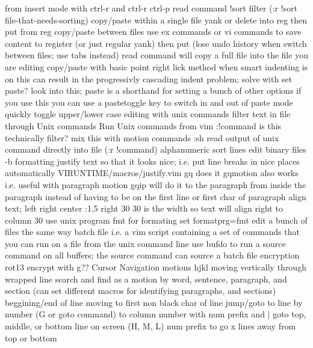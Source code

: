 \documentclass[12pt]{book}
\begin{document}
      from insert mode with ctrl-r and ctrl-r ctrl-p
    read command
      !sort filter (:r !sort file-that-needs-sorting)
    copy/paste within a single file
      yank or delete into reg then put from reg
    copy/paste between files
      use ex commands or vi commands to save content to register (or just regular yank) then put (lose undo history when switch between files; use tabs instead)
      read command will copy a full file into the file you are editing
    copy/paste with basic point right lick method
      when smart indenting is on this can result in the progressivly cascading indent problem;
        solve with set paste?  look into this; paste is a shorthand for setting a bunch of other options
        if you use this you can use a pastetoggle key to switch in and out of paste mode quickly
  toggle upper/lower case
  editing with unix commands
    filter text in file through Unix commands
    Run Unix commands from vim
      :!command
        is this technically filter?
        mix this with motion commands
      :sh
      read output of unix command directly into file (:r !command)
  alphanumeric sort lines
  edit binary files -b
  formatting
    justify text so that it looks nice; i.e. put line breaks in nice places automatically
      VIRUNTIME/macros/justify.vim
      gq does it
      gqmotion also works i.e. useful with paragraph motion
      gqip will do it to the paragraph from inside the paragraph instead of having to be on the first line or first char of paragraph
    align text; left right center
      :1,5 right 30
      30 is the width so text will align right to column 30
    use unix program fmt for formating
      set formatprg=fmt
  edit a bunch of files the same way
    batch file i.e. a vim script containing a set of commands that you can run on a file from the unix command line
    use bufdo to run a source command on all buffers; the source command can source a batch file
  encryption
    rot13 encrypt with g??
Cursor Navigation
  motions
    hjkl
    moving vertically through wrapped line
    search and find as a motion
    by word, sentence, paragraph, and section (can set different macros for identifying paragraphs, and sections)
    beggining/end of line
    moving to first non black char of line
    jump/goto
      to line by number (G or goto command)
      to column number with num prefix and |
      goto top, middle, or bottom line on screen (H, M, L) num prefix to go x lines away from top or bottom
\end{document}

